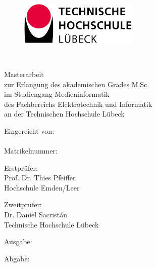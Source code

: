 \begin{titlepage}

\begin{center}

\begin{figure}[tbh]
 \centering
 \includegraphics[width=0.5\textwidth]{images/th-logo.png}
\end{figure}

\vspace{1.cm}

{
 \fontsize{20}{28}\selectfont
 \myTitle\\[0.5cm]
}

\fontsize{12}{12}\selectfont

\vspace{1.cm}

Masterarbeit\\
zur Erlangung des akademischen Grades M.Sc.\\
im Studiengang Medieninformatik\\
des Fachbereichs Elektrotechnik und Informatik\\
an der Technischen Hochschule Lübeck

\vspace{0.5cm}

Eingereicht von:\\
\myAuthor\\
Matrikelnummer: \myMatrikelnummer

\vspace{0.5cm}

Erstprüfer:\\
Prof. Dr. Thies Pfeiffer\\
Hochschule Emden/Leer\\


\vspace{.2cm}

Zweitprüfer:\\
Dr. Daniel Sacristán\\
Technische Hochschule Lübeck\\


\vspace{0.5cm}

Ausgabe: \startDate

Abgabe: \myDate

\end{center}
\end{titlepage}
